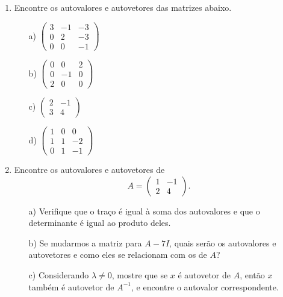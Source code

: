 \documentclass[12pt]{article}
\begin{document}
\begin{enumerate}
   \item Encontre os autovalores e autovetores das matrizes abaixo.
   \begin{center}
      \begin{minipage}{0.4\textwidth}
         \begin{itemize}
            \item[a)] $\begin{pmatrix} 3 & -1 & -3\\0 & 2 & -3\\0 & 0 & -1\end{pmatrix}$
            \item[b)] $\begin{pmatrix} 0 & 0 & 2\\0 & -1 & 0\\2 & 0 & 0\end{pmatrix}$
         \end{itemize}
      \end{minipage}
      \begin{minipage}{0.4\textwidth}
         \begin{itemize}
            \item[c)] $\begin{pmatrix} 2 & -1\\3 & 4\end{pmatrix}$
            \item[d)] $\begin{pmatrix} 1 & 0 & 0\\1 & 1 & -2\\0 & 1 & -1\end{pmatrix}$
         \end{itemize}
      \end{minipage}
   \end{center}

\item Encontre os autovalores e autovetores de
  \begin{equation*}
    A = \begin{pmatrix}1 & -1\\2 & 4\end{pmatrix}.
  \end{equation*}
  \begin{itemize}
  \item[a)] Verifique que o traço é igual à soma dos autovalores e que o determinante é igual ao produto deles. 
  \item[b)] Se mudarmos a matriz para $A-7I$, quais serão os autovalores e autovetores e como eles se relacionam com os de $A$?
  \item[c)] Considerando $\lambda \ne 0$, mostre que se $x$ é autovetor de $A$, então $x$ também é autovetor de $A^{-1}$, e encontre o autovalor correspondente.
  \end{itemize}
  

\end{enumerate}
\end{document}
